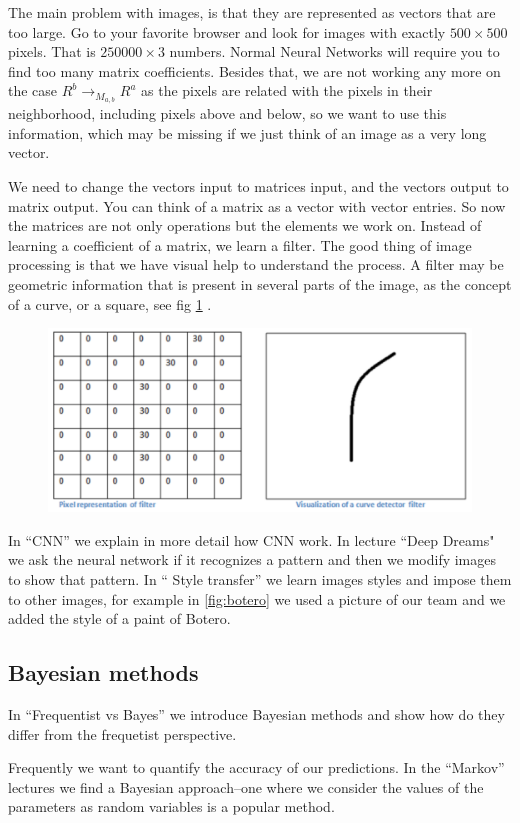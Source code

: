 \documentclass[11pt,letterpaper]{report}
\begin{document}
	The main problem with images, is that they are represented as vectors that are too large. Go to your favorite browser and look for images with exactly  $500\times500$ pixels. That is $250000\times3$ numbers. Normal Neural Networks will require you to find too many matrix coefficients. Besides that, we are not working any more on the case $R^b\rightarrow_{ M_{a,b}} R^a$ as the pixels are related with the pixels in their neighborhood, including pixels above and below, so we want to use this information, which may be missing if we just think of an image as a very long vector. 
	 
	
	We need to change the vectors input to matrices input,  and the vectors output to matrix output. You can think of a matrix as a vector with vector entries.  So now the matrices are not only operations but the elements we work on.
	Instead of learning a coefficient of a matrix, we learn a filter. The good thing of image processing is that we have visual help to understand the process. A filter may be geometric information that is present in several parts of the image, as the concept of a curve, or a square, see fig \ref{fig:filter} .  
	
	\begin{figure}[h!]
		\centering
		\includegraphics[width=0.45\linewidth]{figures/filter.png}
		\caption{}
		\label{fig:filter}
	\end{figure} 	

	
	In ``CNN'' we explain in more detail how CNN work. In lecture ``Deep Dreams" we ask the neural network if it recognizes a pattern and then we modify images to show that pattern. In `` Style transfer'' we learn images styles and impose them to other images, for example  in \ref{fig:botero} we used a picture of our team and we added the style of a paint of Botero. %
	
	
\subsection{Bayesian methods}
In ``Frequentist vs Bayes''
 we introduce Bayesian methods and show how do they differ from the frequetist perspective. 
 
Frequently we want to quantify the accuracy of our predictions. In the ``Markov'' lectures we find a Bayesian approach--one where we consider the values of the parameters as random variables is a popular method.
\end{document}
